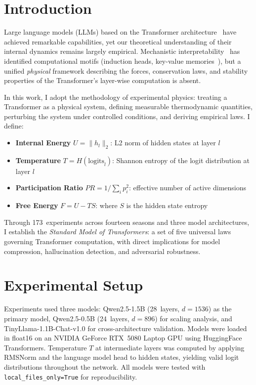 \documentclass[11pt,a4paper]{article}
\begin{document}
\section{Introduction}

Large language models (LLMs) based on the Transformer architecture~\citep{vaswani2017} have achieved remarkable capabilities, yet our theoretical understanding of their internal dynamics remains largely empirical. Mechanistic interpretability~\citep{elhage2021,olsson2022} has identified computational motifs (induction heads, key-value memories~\citep{geva2021}), but a unified \textit{physical} framework describing the forces, conservation laws, and stability properties of the Transformer's layer-wise computation is absent.

In this work, I adopt the methodology of experimental physics: treating a Transformer as a physical system, defining measurable thermodynamic quantities, perturbing the system under controlled conditions, and deriving empirical laws. I define:
\begin{itemize}
    \item \textbf{Internal Energy} $U = \|h_l\|_2$: L2 norm of hidden states at layer $l$
    \item \textbf{Temperature} $T = H(\text{logits}_l)$: Shannon entropy of the logit distribution at layer $l$
    \item \textbf{Participation Ratio} $PR = 1/\sum_i p_i^2$: effective number of active dimensions
    \item \textbf{Free Energy} $F = U - TS$: where $S$ is the hidden state entropy
\end{itemize}

Through 173~experiments across fourteen seasons and three model architectures, I establish the \textit{Standard Model of Transformers}: a set of five universal laws governing Transformer computation, with direct implications for model compression, hallucination detection, and adversarial robustness.

\section{Experimental Setup}

Experiments used three models: Qwen2.5-1.5B (28~layers, $d = 1536$) as the primary model, Qwen2.5-0.5B (24~layers, $d = 896$) for scaling analysis, and TinyLlama-1.1B-Chat-v1.0 for cross-architecture validation. Models were loaded in float16 on an NVIDIA GeForce RTX~5080 Laptop GPU using HuggingFace Transformers. Temperature $T$ at intermediate layers was computed by applying RMSNorm and the language model head to hidden states, yielding valid logit distributions throughout the network. All models were tested with \texttt{local\_files\_only=True} for reproducibility.
\end{document}
